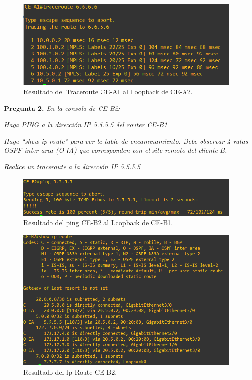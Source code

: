 \documentclass[a4paper, 12pt]{report}
\begin{document}
\begin{figure}[H]
	\centering
	\includegraphics[scale=0.6]{traceroute6666.png}
	\caption{Resultado del Traceroute CE-A1 al Loopback de CE-A2.}
	\label{fig:traceroute6666}
\end{figure}
\newpage
\textbf{Pregunta 2.}
\textit{En la consola de CE-B2:}


\textit{Haga PING a la dirección IP 5.5.5.5 del router CE-B1.}

\textit{Haga “show ip route” para ver la tabla de encaminamiento. Debe observar 4 rutas OSPF
ínter area (O IA) que corresponden con el site remoto del cliente B.}

\textit{Realice un traceroute a la dirección IP 5.5.5.5}

\begin{figure}[H]
	\centering
	\includegraphics[scale=0.6]{ping5555.png}
	\caption{Resultado del ping CE-B2 al Loopback de CE-B1.}
	\label{fig:ping5555}
\end{figure}

\begin{figure}[H]
	\centering
	\includegraphics[scale=0.6]{showiprouteb2.png}
	\caption{Resultado del Ip Route CE-B2.}
	\label{fig:showiprouteb2}
\end{figure}
\end{document}
